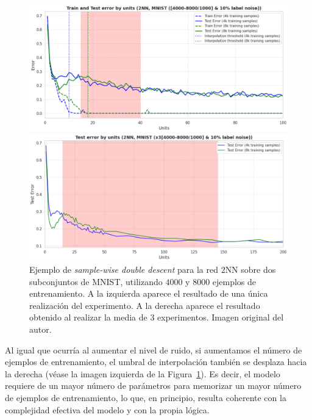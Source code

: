 \begin{figure}[h!]
    \centering
    \begin{minipage}{0.49\textwidth}
        \centering
        \includegraphics[width=\linewidth]{img/experiments/sample-wise-dd1.png}
    \end{minipage}
    \hfill
    \begin{minipage}{0.49\textwidth}
        \centering
        \includegraphics[width=\linewidth]{img/experiments/sample-wise-dd2.png}
    \end{minipage}
    \caption[Ejemplo de \textit{sample-wise double descent}.]{Ejemplo de \textit{sample-wise double descent} para la red $2$NN sobre dos subconjuntos de MNIST, utilizando $4000$ y $8000$ ejemplos de entrenamiento. A la izquierda aparece el resultado de una única realización del experimento. A la derecha aparece el resultado obtenido al realizar la media de $3$ experimentos. Imagen original del autor.}
    \label{fig:swdd}
\end{figure}

Al igual que ocurría al aumentar el nivel de ruido, si aumentamos el número de ejemplos de entrenamiento, el umbral de interpolación también se desplaza hacia la derecha (véase la imagen izquierda de la Figura~\ref{fig:swdd}). Es decir, el modelo requiere de un mayor número de parámetros para memorizar un mayor número de ejemplos de entrenamiento, lo que, en principio, resulta coherente con la complejidad efectiva del modelo y con la propia lógica.\newline

